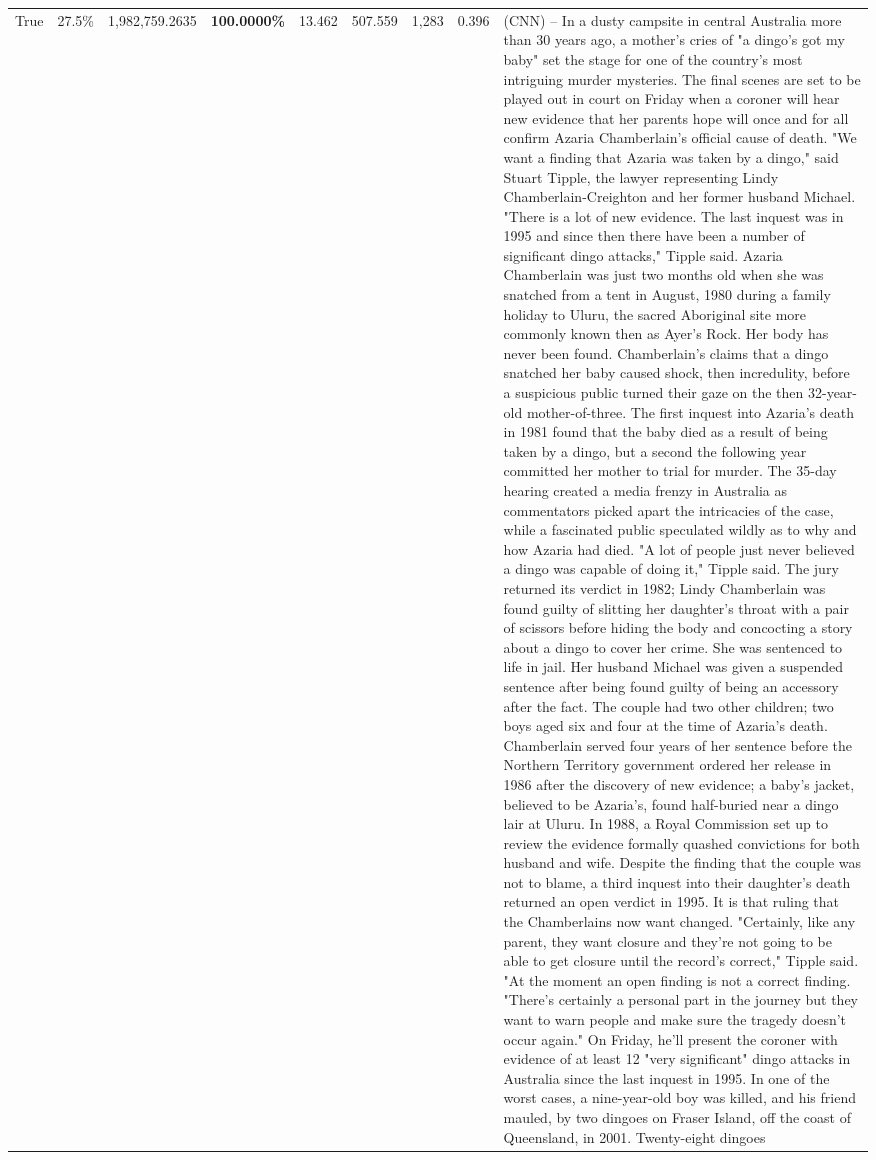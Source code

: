 \begin{table}[H]
\begin{tabular}{lllrlllll}
True & 27.5\% & 1,982,759.2635 & \bfseries \color{red} 100.0000\% & 13.462 & 507.559 & 1,283 & 0.396 & (CNN) -- In a dusty campsite in central Australia more than 30 years ago, a mother's cries of "a dingo's got my baby" set the stage for one of the country's most intriguing murder mysteries. The final scenes are set to be played out in court on Friday when a coroner will hear new evidence that her parents hope will once and for all confirm Azaria Chamberlain's official cause of death. "We want a finding that Azaria was taken by a dingo," said Stuart Tipple, the lawyer representing Lindy Chamberlain-Creighton and her former husband Michael. "There is a lot of new evidence. The last inquest was in 1995 and since then there have been a number of significant dingo attacks," Tipple said. Azaria Chamberlain was just two months old when she was snatched from a tent in August, 1980 during a family holiday to Uluru, the sacred Aboriginal site more commonly known then as Ayer's Rock. Her body has never been found. Chamberlain's claims that a dingo snatched her baby caused shock, then incredulity, before a suspicious public turned their gaze on the then 32-year-old mother-of-three. The first inquest into Azaria's death in 1981 found that the baby died as a result of being taken by a dingo, but a second the following year committed her mother to trial for murder. The 35-day hearing created a media frenzy in Australia as commentators picked apart the intricacies of the case, while a fascinated public speculated wildly as to why and how Azaria had died. "A lot of people just never believed a dingo was capable of doing it," Tipple said. The jury returned its verdict in 1982; Lindy Chamberlain was found guilty of slitting her daughter's throat with a pair of scissors before hiding the body and concocting a story about a dingo to cover her crime. She was sentenced to life in jail. Her husband Michael was given a suspended sentence after being found guilty of being an accessory after the fact. The couple had two other children; two boys aged six and four at the time of Azaria's death. Chamberlain served four years of her sentence before the Northern Territory government ordered her release in 1986 after the discovery of new evidence; a baby's jacket, believed to be Azaria's, found half-buried near a dingo lair at Uluru. In 1988, a Royal Commission set up to review the evidence formally quashed convictions for both husband and wife. Despite the finding that the couple was not to blame, a third inquest into their daughter's death returned an open verdict in 1995. It is that ruling that the Chamberlains now want changed. "Certainly, like any parent, they want closure and they're not going to be able to get closure until the record's correct," Tipple said. "At the moment an open finding is not a correct finding. "There's certainly a personal part in the journey but they want to warn people and make sure the tragedy doesn't occur again." On Friday, he'll present the coroner with evidence of at least 12 "very significant" dingo attacks in Australia since the last inquest in 1995. In one of the worst cases, a nine-year-old boy was killed, and his friend mauled, by two dingoes on Fraser Island, off the coast of Queensland, in 2001. Twenty-eight dingoes 
\end{tabular}
\end{table}
